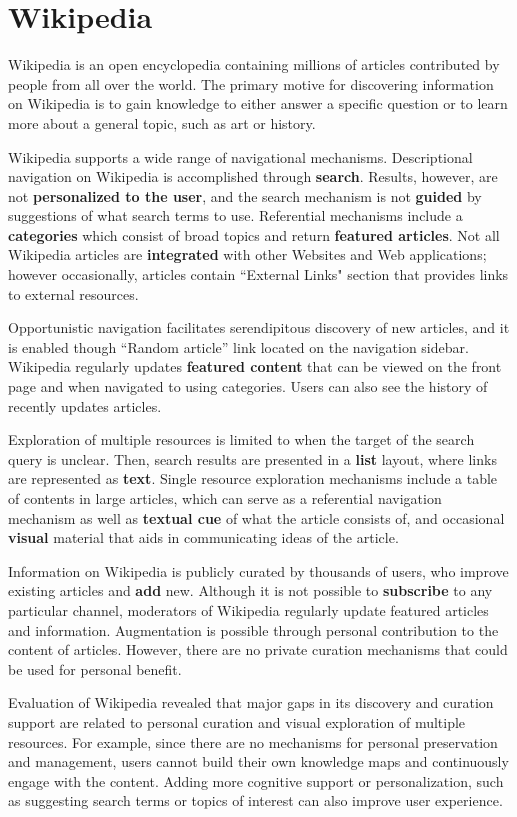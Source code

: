 {\section{Wikipedia}
Wikipedia is an open encyclopedia containing millions of articles contributed by people from all over the world. The primary motive for discovering information on Wikipedia is to gain knowledge to either answer a specific question or to learn more about a general topic, such as art or history.

Wikipedia supports a wide range of navigational mechanisms. Descriptional navigation on Wikipedia is accomplished through \textbf{search}. Results, however, are not \textbf{personalized to the user}, and the search mechanism is not \textbf{guided} by suggestions of what search terms to use. Referential mechanisms include a \textbf{categories} which consist of broad topics and return \textbf{featured articles}. Not all Wikipedia articles are \textbf{integrated} with other Websites and Web applications; however occasionally, articles contain ``External Links" section that provides links to external resources. 

Opportunistic navigation facilitates serendipitous discovery of new articles, and it is enabled though ``Random article'' link located on the navigation sidebar. Wikipedia regularly updates \textbf{featured content} that can be viewed on the front page and when navigated to using categories. Users can also see the history of recently updates articles. 

Exploration of multiple resources is limited to when the target of the search query is unclear. Then, search results are presented in a \textbf{list} layout, where links are represented as \textbf{text}. Single resource exploration mechanisms include a table of contents in large articles, which can serve as a referential navigation mechanism as well as \textbf{textual cue} of what the article consists of, and occasional \textbf{visual} material that aids in communicating ideas of the article.  

Information on Wikipedia is publicly curated by thousands of users, who improve existing articles and \textbf{add} new. Although it is not possible to \textbf{subscribe} to any particular channel, moderators of Wikipedia regularly update featured articles and information. Augmentation is possible through personal contribution to the content of articles. However, there are no private curation mechanisms that could be used for personal benefit. 

Evaluation of Wikipedia revealed that major gaps in its discovery and curation support are related to personal curation and visual exploration of multiple resources. For example, since there are no mechanisms for personal preservation and management, users cannot build their own knowledge maps and continuously engage with the content. Adding more cognitive support or personalization, such as suggesting search terms or topics of interest can also improve user experience.

} %


